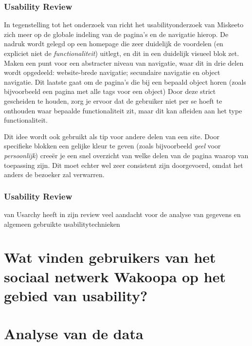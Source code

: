 \documentclass[a4paper, 10pt, pdftex]{report}
\begin{document}
    \subsection{Usability Review \citet{Hoekman2008}}
    In tegenstelling tot het onderzoek van \citeauthor{Alfrink2008} richt het usabilityonderzoek van Miskeeto zich meer op de globale indeling van de pagina's en de navigatie hierop. De nadruk wordt gelegd op een homepage die zeer duidelijk de voordelen (en expliciet niet de \emph{functionaliteit}) uitlegt, en dit in een duidelijk visueel blok zet. \citeauthor{Hoekman2008} Maken een punt voor een abstracter niveau van navigatie, waar dit in drie delen wordt opgedeeld: website-brede navigatie; secundaire navigatie en object navigatie. Dit laatste gaat om de pagina's die bij een bepaald object horen (zoals bijvoorbeeld een pagina met alle tags voor een object) Door deze strict gescheiden te houden, zorg je ervoor dat de gebruiker niet per se hoeft te onthouden waar bepaalde functionaliteit zit, maar dit kan afleiden aan het type functionaliteit.

    Dit idee wordt ook gebruikt als tip voor andere delen van een site. Door specifieke blokken een gelijke kleur te geven (zoals bijvoorbeeld \emph{geel} voor \emph{persoonlijk}) cree\"er je een snel overzicht van welke delen van de pagina waarop van toepassing zijn. Dit moet echter wel zeer consistent zijn doorgevoerd, omdat het anders de bezoeker zal verwarren.

    \subsection{Usability Review \citet{Timmerman2008}}
    \citeauthor{Timmerman2008} van Usarchy heeft in zijn review veel aandacht voor de analyse van gegevens en algemeen gebruikte usabilitytechnieken




  \newpage
  \chapter{Wat vinden gebruikers van het sociaal netwerk Wakoopa op het gebied van usability?}
    \newpage

  \newpage
  \chapter{Analyse van de data}
    \label{datachapter}
    \newpage
\end{document}

